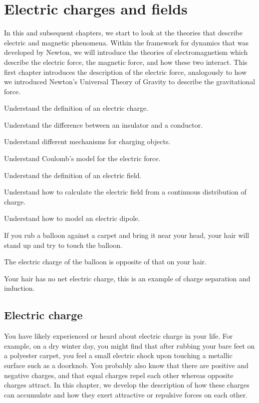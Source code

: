 \chapter{Electric charges and fields}
\label{chapter:chargesfields}
In this and subsequent chapters, we start to look at the theories that describe electric and magnetic phenomena. Within the framework for dynamics that was developed by Newton, we will introduce the theories of electromagnetism which describe the electric force, the magnetic force, and how these two interact. This first chapter introduces the description of the electric force, analogously to how we introduced Newton's Universal Theory of Gravity to describe the gravitational force. 


\begin{learningObjectives}{
 \item Understand the definition of an electric charge.
 \item Understand the difference between an insulator and a conductor.
 \item Understand different mechanisms for charging objects.
 \item Understand Coulomb's model for the electric force.
 \item Understand the definition of an electric field.
 \item Understand how to calculate the electric field from a continuous distribution of charge.
 \item Understand how to model an electric dipole.
 }
\end{learningObjectives}

\begin{opening}
\begin{MCquestion}{If you rub a balloon against a carpet and bring it near your head, your hair will stand up and try to touch the balloon.}
\item The electric charge of the balloon is opposite of that on your hair.
\item Your hair has no net electric charge, this is an example of charge separation and induction. \correct
\end{MCquestion}
\end{opening}

\section{Electric charge}
You have likely experienced or heard about electric charge in your life. For example, on a dry winter day, you might find that after rubbing your bare feet on a polyester carpet, you feel a small electric shock upon touching a metallic surface such as a doorknob. You probably also know that there are positive and negative charges, and that equal charges repel each other whereas opposite charges attract. In this chapter, we develop the description of how these charges can accumulate and how they exert attractive or repulsive forces on each other. 

